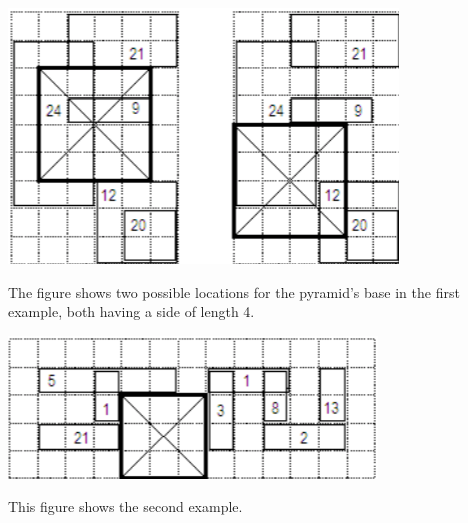\includegraphics{pyramid1.png}

The figure shows two possible locations for the pyramid's base in the first example, both having a side of length 4.

\includegraphics{pyramid2.png}

This figure shows the second example.